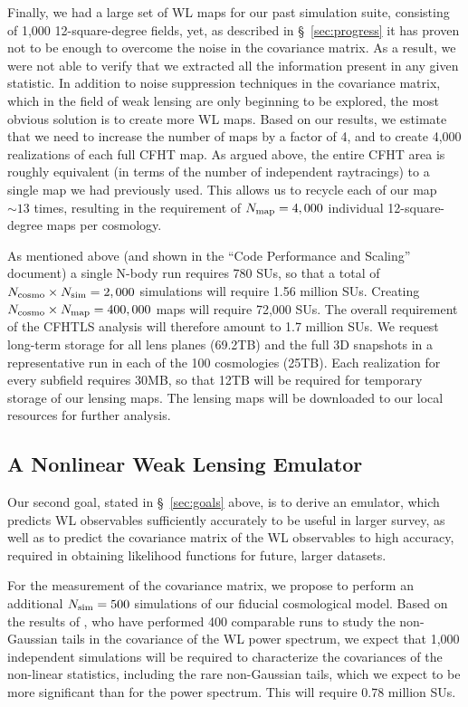 \documentclass[10pt, preprint]{aastex}
\begin{document}
Finally, we had a large set of WL maps for our past simulation suite,
consisting of 1,000 12-square-degree fields, yet, as described in
\S~\ref{sec:progress} it has proven not to be enough to overcome the
noise in the covariance matrix. As a result, we were not able to
verify that we extracted all the information present in any given
statistic. In addition to noise suppression techniques in the
covariance matrix, which in the field of weak lensing are only
beginning to be explored, the most obvious solution is to create more
WL maps. Based on our results, we estimate that we need to increase
the number of maps by a factor of 4, and to create 4,000 realizations
of each full CFHT map. As argued above, the entire CFHT area is
roughly equivalent (in terms of the number of independent raytracings)
to a single map we had previously used.  This allows us to recycle
each of our map $\sim 13$ times, resulting in the requirement of
$N_{\rm map}=4,000$ individual 12-square-degree maps per cosmology.

As mentioned above (and shown in the ``Code Performance and Scaling''
document) a single N-body run requires 780 SUs, so that a total of
$N_{\rm cosmo}\times N_{\rm sim}=2,000$ simulations will require 1.56
million SUs.  Creating $N_{\rm cosmo}\times N_{\rm map}=400,000$ maps
will require 72,000 SUs.  The overall requirement of the CFHTLS
analysis will therefore amount to 1.7 million SUs.  We request
long-term storage for all lens planes (69.2TB) and the full 3D
snapshots in a representative run in each of the 100 cosmologies
(25TB).  Each realization for every subfield requires 30MB, so that
12TB will be required for temporary storage of our lensing maps.  The
lensing maps will be downloaded to our local resources for further
analysis.

\subsection{A Nonlinear Weak Lensing Emulator}

Our second goal, stated in \S~\ref{sec:goals} above, is to derive an
emulator, which predicts WL observables sufficiently accurately to be
useful in larger survey, as well as to predict the covariance matrix
of the WL observables to high accuracy, required in obtaining
likelihood functions for future, larger datasets.  

For the measurement of the covariance matrix, we propose to perform an
additional $N_{\rm sim}=500$ simulations of our fiducial cosmological
model.  Based on the results of \cite{Sato09}, who have performed 400
comparable runs to study the non-Gaussian tails in the covariance of
the WL power spectrum, we expect that 1,000 independent simulations
will be required to characterize the covariances of the non-linear
statistics, including the rare non-Gaussian tails, which we expect to
be more significant than for the power spectrum.  This will require
0.78 million SUs.
\end{document}
